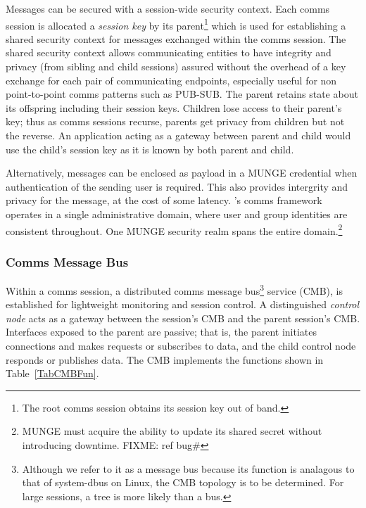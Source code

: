 Messages can be secured with a session-wide security context.
Each comms session is allocated a {\em session key} by its parent\footnote{
The root comms session obtains its session key out of band.}
which is used for establishing a shared security context
for messages exchanged within the comms session.
The shared security context allows communicating entities to have integrity
and privacy (from sibling and child sessions) assured without the overhead
of a key exchange for each pair of communicating endpoints,
especially useful for non point-to-point comms patterns such as PUB-SUB.
The parent retains state about its offspring including their session keys.
Children lose access to their parent's key;  thus as comms sessions recurse,
parents get privacy from children but not the reverse.
An application acting as a gateway between parent and child would use
the child's session key as it is known by both parent and child.

Alternatively, messages can be enclosed as payload in a MUNGE\cite{MUNGE}
credential when authentication of the sending user is required.
This also provides intergrity and privacy for the message, at the cost
of some latency.
\ngrm's comms framework operates in
a single administrative domain, where user and group identities are
consistent throughout.  One MUNGE security realm spans the entire
domain.\footnote{MUNGE must acquire the ability to update its shared
secret without introducing downtime. FIXME: ref bug\#}

\subsubsection{Comms Message Bus}

Within a comms session, a distributed comms message bus\footnote{
Although we refer to it as a message bus because its function
is analagous to that of system-dbus on Linux, the CMB topology is to
be determined.  For large sessions, a tree is more likely than a bus.}
service (CMB), is established for lightweight monitoring and session control.
A distinguished {\em control node} acts as a gateway between the
session's CMB and the parent session's CMB.  Interfaces exposed to the
parent are passive; that is, the parent initiates connections and
makes requests or subscribes to data, and the child control node
responds or publishes data.  The CMB implements the functions shown
in Table~\ref{TabCMBFun}.

